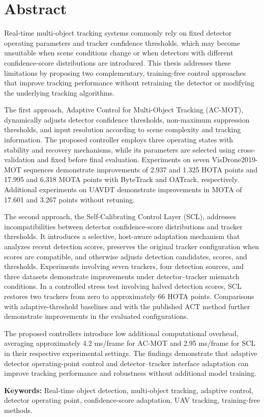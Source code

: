 \chapter*{Abstract}

Real-time multi-object tracking systems commonly rely on fixed detector operating parameters and tracker confidence thresholds, which may become unsuitable when scene conditions change or when detectors with different confidence-score distributions are introduced. This thesis addresses these limitations by proposing two complementary, training-free control approaches that improve tracking performance without retraining the detector or modifying the underlying tracking algorithms.

The first approach, Adaptive Control for Multi-Object Tracking (AC-MOT), dynamically adjusts detector confidence thresholds, non-maximum suppression thresholds, and input resolution according to scene complexity and tracking information. The proposed controller employs three operating states with stability and recovery mechanisms, while its parameters are selected using cross-validation and fixed before final evaluation. Experiments on seven VisDrone2019-MOT sequences demonstrate improvements of 2.937 and 1.325 HOTA points and 17.995 and 6.318 MOTA points with ByteTrack and OATrack, respectively. Additional experiments on UAVDT demonstrate improvements in MOTA of 17.601 and 3.267 points without retuning.

The second approach, the Self-Calibrating Control Layer (SCL), addresses incompatibilities between detector confidence-score distributions and tracker thresholds. It introduces a selective, host-aware adaptation mechanism that analyzes recent detection scores, preserves the original tracker configuration when scores are compatible, and otherwise adjusts detection candidates, scores, and thresholds. Experiments involving seven trackers, four detection sources, and three datasets demonstrate improvements under detector--tracker mismatch conditions. In a controlled stress test involving halved detection scores, SCL restores two trackers from zero to approximately 66 HOTA points. Comparisons with adaptive-threshold baselines and with the published ACT method further demonstrate improvements in the evaluated configurations.

The proposed controllers introduce low additional computational overhead, averaging approximately 4.2 ms/frame for AC-MOT and 2.95 ms/frame for SCL in their respective experimental settings. The findings demonstrate that adaptive detector operating-point control and detector--tracker interface adaptation can improve tracking performance and robustness without additional model training.

\vspace{0.5cm}
\noindent\textbf{Keywords:} Real-time object detection, multi-object tracking, adaptive control, detector operating point, confidence-score adaptation, UAV tracking, training-free methods.
